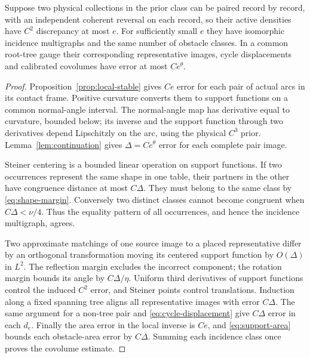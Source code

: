 \begin{lemma}\label{lem:sync-stable}
Suppose two physical collections in the prior class can be paired record
by record, with an independent coherent reversal on each record, so their
active densities have $C^2$ discrepancy at most $e$. For sufficiently
small $e$ they have isomorphic incidence multigraphs and the same number
of obstacle classes. In a common root-tree gauge their corresponding
representative images, cycle displacements and calibrated covolumes
have error at most $Ce^\theta$.
\end{lemma}
\begin{proof}
Proposition~\ref{prop:local-stable} gives $Ce$ error for each pair of
actual arcs in its contact frame. Positive curvature converts them to
support functions on a common normal-angle interval. The normal-angle
map has derivative equal to curvature, bounded below; its inverse and
the support function through two derivatives depend Lipschitzly on the
arc, using the physical $C^3$ prior. Lemma~\ref{lem:continuation} gives
$\Delta=Ce^\theta$ error for each complete pair image.

Steiner centering is a bounded linear operation on support functions.
If two occurrences represent the same shape in one table, their partners
in the other have congruence distance at most $C\Delta$. They must belong
to the same class by \eqref{eq:shape-margin}. Conversely two distinct
classes cannot become congruent when $C\Delta<\nu/4$. Thus the equality
pattern of all occurrences, and hence the incidence multigraph, agrees.

Two approximate matchings of one source image to a placed representative
differ by an orthogonal transformation moving its centered support
function by $O(\Delta)$ in $L^2$. The reflection margin excludes the
incorrect component; the rotation margin bounds its angle by
$C\Delta/\eta$. Uniform third derivatives of support functions control
the induced $C^2$ error, and Steiner points control translations.
Induction along a fixed spanning tree aligns all representative images
with error $C\Delta$. The same argument for a non-tree pair and
\eqref{eq:cycle-displacement} give $C\Delta$ error in each $d_e$.
Finally the area error in the local inverse is $Ce$, and
\eqref{eq:support-area} bounds each obstacle-area error by $C\Delta$.
Summing each incidence class once proves the covolume estimate.
\end{proof}

